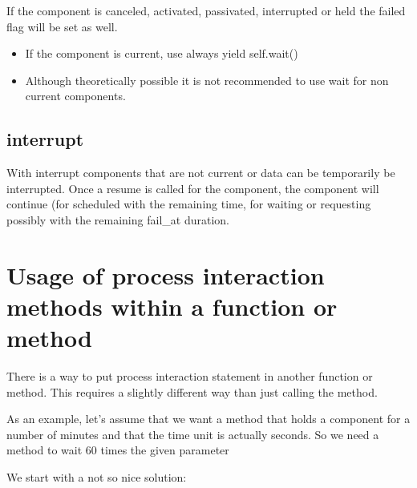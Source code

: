 \documentclass[letterpaper,10pt,english]{sphinxmanual}
\begin{document}
If the component is canceled, activated, passivated, interrupted or held the failed flag will be set as well.
\begin{itemize}
\item {} 
If the component is current, use always yield self.wait()

\item {} 
Although theoretically possible it is not recommended to use wait for non current components.

\end{itemize}


\subsection{interrupt}
\label{\detokenize{Component:interrupt}}
With interrupt components that are not current or data can be temporarily be interrupted. Once a resume is called for
the component, the component will continue (for scheduled with the remaining time, for waiting or requesting possibly with
the remaining fail\_at duration.


\section{Usage of process interaction methods within a function or method}
\label{\detokenize{Component:usage-of-process-interaction-methods-within-a-function-or-method}}
There is a way to put process interaction statement in another function or method.
This requires a slightly different way than just calling the method.

As an example, let’s assume that we want a method that holds a component for a number of minutes and that the time unit is actually seconds.
So we need a method to wait 60 times the given parameter

We start with a not so nice solution:

\begin{sphinxVerbatim}[commandchars=\\\{\}]
 
     
           
           
\end{sphinxVerbatim}
\end{document}
